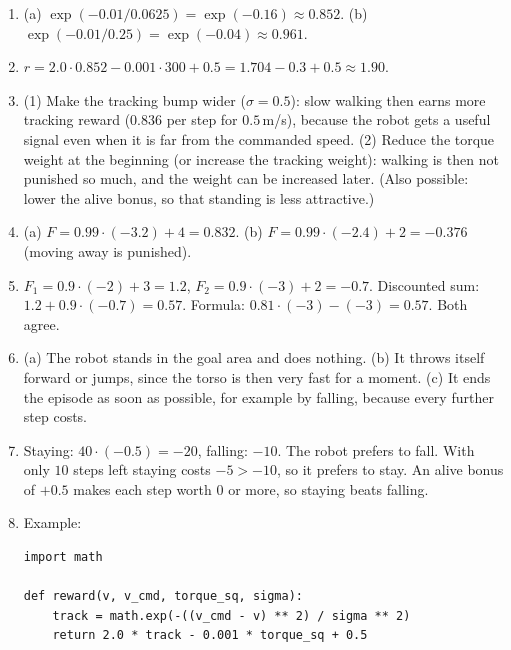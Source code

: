 \begin{enumerate}[label=\textbf{\ansnum.\arabic*}]
  \item (a) $\exp(-0.01/0.0625)=\exp(-0.16)\approx0.852$. (b) $\exp(-0.01/0.25)=\exp(-0.04)\approx0.961$.
  \item $r=2.0\cdot0.852-0.001\cdot300+0.5=1.704-0.3+0.5\approx1.90$.
  \item (1) Make the tracking bump wider ($\sigma=0.5$): slow walking then earns more tracking reward ($0.836$ per step for $0.5$\,m/s), because the robot gets a useful signal even when it is far from the commanded speed. (2) Reduce the torque weight at the beginning (or increase the tracking weight): walking is then not punished so much, and the weight can be increased later. (Also possible: lower the alive bonus, so that standing is less attractive.)
  \item (a) $F=0.99\cdot(-3.2)+4=0.832$. (b) $F=0.99\cdot(-2.4)+2=-0.376$ (moving away is punished).
  \item $F_1=0.9\cdot(-2)+3=1.2$, $F_2=0.9\cdot(-3)+2=-0.7$. Discounted sum: $1.2+0.9\cdot(-0.7)=0.57$. Formula: $0.81\cdot(-3)-(-3)=0.57$. Both agree.
  \item (a) The robot stands in the goal area and does nothing. (b) It throws itself forward or jumps, since the torso is then very fast for a moment. (c) It ends the episode as soon as possible, for example by falling, because every further step costs.
  \item Staying: $40\cdot(-0.5)=-20$, falling: $-10$. The robot prefers to fall. With only $10$ steps left staying costs $-5>-10$, so it prefers to stay. An alive bonus of $+0.5$ makes each step worth $0$ or more, so staying beats falling.
  \item Example:
\begin{verbatim}
import math

def reward(v, v_cmd, torque_sq, sigma):
    track = math.exp(-((v_cmd - v) ** 2) / sigma ** 2)
    return 2.0 * track - 0.001 * torque_sq + 0.5


\end{verbatim}
\end{enumerate}

